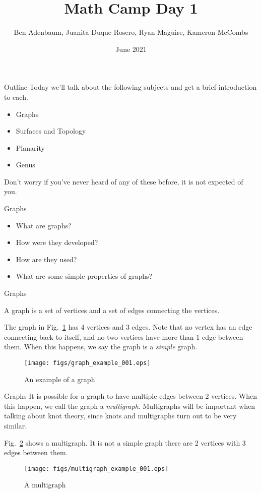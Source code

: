 \documentclass{beamer}
\title{Math Camp Day 1}
\author{Ben Adenbaum, Juanita Duque-Rosero, Ryan Maguire, Kameron McCombs}
\date{June 2021}
\begin{document}
    \maketitle
    \begin{frame}{Outline}
        Today we'll talk about the following subjects and get a brief
        introduction to each.
        \begin{itemize}
            \item Graphs
            \item Surfaces and Topology
            \item Planarity
            \item Genus
        \end{itemize}
        Don't worry if you've never heard of any of these before, it is not expected of you.
    \end{frame}
    \begin{frame}{Graphs}
        \begin{itemize}
            \item What are graphs?
            \item How were they developed?
            \item How are they used?
            \item What are some simple properties of graphs?
        \end{itemize}
    \end{frame}
    \begin{frame}{Graphs}
        \begin{definition}
            A graph is a set of vertices and a set of edges connecting
            the vertices.
        \end{definition}
        The graph in Fig.~\ref{fig:graph_example_001} has 4 vertices and 3 edges.
        Note that no vertex has an edge connecting back to itself, and no two
        vertices have more than 1 edge between them. When this happens, we say
        the graph is a \textit{simple} graph.
        \begin{figure}
            \centering
            \texttt{[image: figs/graph\_example\_001.eps]}
            \caption{An example of a graph}
            \label{fig:graph_example_001}
        \end{figure}
    \end{frame}
    \begin{frame}{Graphs}
        It is possible for a graph to have multiple edges between 2 vertices.
        When this happen, we call the graph a \textit{multigraph}. Multigraphs will
        be important when talking about knot theory, since knots and multigraphs turn
        out to be very similar.
        \par\hfill\par
        Fig.~\ref{fig:multigraph_example_001} shows a multigraph. It is not a simple graph
        there are 2 vertices with 3 edges between them.
        \begin{figure}
            \centering
            \texttt{[image: figs/multigraph\_example\_001.eps]}
            \caption{A multigraph}
            \label{fig:multigraph_example_001}
        \end{figure}
    \end{frame}
\end{document}
